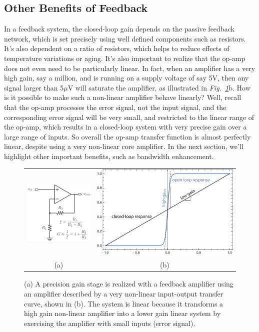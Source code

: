 \subsection{Other Benefits of Feedback}
In a feedback system, the closed-loop gain depends on the passive feedback network, which is set precisely using well defined components such as resistors.  It's also dependent on a ratio of resistors, which helps to reduce effects of temperature variations or aging.  It's also important to realize that the op-amp does not even need to be particularly linear.  In fact, when an amplifier has a very high gain, say a million, and is running on a supply voltage of say 5V, then any signal larger than 5$\mu$V will saturate the amplifier, as illustrated in \emph{Fig.~\ref{fig:opamp_fb_precise}}b.  How is it possible to make such a non-linear amplifier behave linearly?  Well, recall that the op-amp processes the error signal, not the input signal, and the corresponding error signal will be very small, and restricted to the linear range of the op-amp, which results in a closed-loop system with very precise gain over a large range of inputs.  So overall the op-amp transfer function is almost perfectly linear, despite using a very non-linear core amplifier. 
In the next section, we'll highlight other important benefits, such as bandwidth enhancement.  
\begin{figure}[tb]
\centering
\begin{tabular}{cc}
\includegraphics[width=.2\columnwidth]{opamp_fb_precise} &
\includegraphics[width=.7\columnwidth]{opamp_gain}\\
(a) & (b) 
\end{tabular}
\caption{(a)  A precision gain stage is realized with a feedback amplifier using an amplifier described by a very non-linear input-output transfer curve, shown in (b).  The system is linear because it transforms a high gain non-linear amplifier into a lower gain linear system by exercising the amplifier with small inputs (error signal).}
\label{fig:opamp_fb_precise}
\end{figure}
